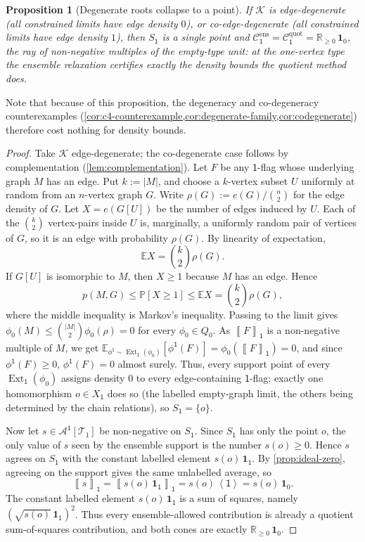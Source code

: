 \documentclass[11pt]{article}
\newtheorem{proposition}[proposition]{Proposition}
\theoremstyle{definition}
\newcommand{\R}{\mathbb{R}}
\newcommand{\E}{\mathbb{E}}
\newcommand{\Prob}{\mathbb{P}}
\newcommand{\A}{\mathcal{A}}
\newcommand{\K}{\mathcal{K}}
\newcommand{\T}{\mathcal{T}}
\newcommand{\C}{\mathcal{C}}
\newcommand{\Ext}{\operatorname{Ext}}
\newcommand{\brak}[1]{\left\langle #1\right\rangle}
\newcommand{\avg}[2]{\left\llbracket #1 \right\rrbracket_{#2}}
\newcommand{\one}{\mathbf 1}
\newcommand{\vtype}{\mathsf{1}}
\begin{document}
\begin{proposition}[Degenerate roots collapse to a point]\label{prop:single-point}
If $\K$ is edge-degenerate (all constrained limits have edge density $0$), or
co-edge-degenerate (all constrained limits have edge density $1$), then $S_{\vtype}$ is a single point
and $\C^{\mathrm{ens}}_{\vtype}=\C^{\mathrm{quot}}_{\vtype}=\R_{\ge0}\,\one_0$, the ray of
non-negative multiples of the empty-type unit: at the one-vertex type the ensemble
relaxation certifies exactly the density bounds the
quotient method does.
\end{proposition}
Note that because of this proposition, the degeneracy and co-degeneracy counterexamples
(\cref{cor:c4-counterexample,cor:degenerate-family,cor:codegenerate}) therefore cost
nothing for density bounds.
\begin{proof}
Take $\K$ edge-degenerate; the co-degenerate case follows by complementation
(\cref{lem:complementation}).  Let $F$ be any \(\vtype\)-flag whose underlying graph $M$ has an
edge.  Put $k:=|M|$, and choose a $k$-vertex subset $U$ uniformly at random from an
$n$-vertex graph $G$.  Write $\rho(G):=e(G)/\binom n2$ for the edge density of $G$.
Let $X=e(G[U])$ be the number of edges induced by $U$.  Each of
the $\binom{k}{2}$ vertex-pairs inside $U$ is, marginally, a uniformly random pair of
vertices of $G$, so it is an edge with probability $\rho(G)$.  By linearity of
expectation,
\[
  \E X=\binom{k}{2}\rho(G).
\]
If $G[U]$ is isomorphic to $M$, then $X\ge1$ because $M$ has an edge.  Hence
\[
  p(M,G)\le \Prob[X\ge1]\le \E X=\binom{k}{2}\rho(G),
\]
where the middle inequality is Markov's inequality.  Passing to the limit gives
$\phi_0(M)\le\binom{|M|}2\phi_0(\rho)=0$ for every $\phi_0\in Q_0$.  As $\avg{F}{\vtype}$ is a
non-negative multiple of $M$, we get
$\E_{\phi^{\vtype}\sim\Ext_{\vtype}(\phi_0)}[\phi^{\vtype}(F)]=\phi_0(\avg{F}{\vtype})=0$, and since
$\phi^{\vtype}(F)\ge0$, $\phi^{\vtype}(F)=0$ almost surely.  Thus, every support point of every
$\Ext_{\vtype}(\phi_0)$ assigns density $0$ to every edge-containing \(\vtype\)-flag; exactly one
homomorphism $o\in X_{\vtype}$ does so (the labelled empty-graph limit, the others being
determined by the chain relations), so $S_{\vtype}=\{o\}$.

Now let $s\in\A^{\vtype}[\T_1]$ be non-negative on $S_{\vtype}$.  Since
$S_{\vtype}$ has only the point $o$, the only value of $s$ seen by the ensemble support
is the number $s(o)\ge0$.  Hence $s$ agrees on $S_{\vtype}$ with the constant labelled
element $s(o)\,\one_{\vtype}$.  By \cref{prop:ideal-zero}, agreeing on the support gives
the same unlabelled average, so
\[
  \avg{s}{\vtype}
  =
  \avg{s(o)\,\one_{\vtype}}{\vtype}
  =
  s(o)\,\brak{\vtype}
  =
  s(o)\,\one_0 .
\]
The constant labelled element $s(o)\,\one_{\vtype}$ is a sum of squares, namely
$(\sqrt{s(o)}\,\one_{\vtype})^2$.  Thus every ensemble-allowed contribution is already a
quotient sum-of-squares contribution, and both cones are exactly
$\R_{\ge0}\,\one_0$.
\end{proof}
\end{document}
